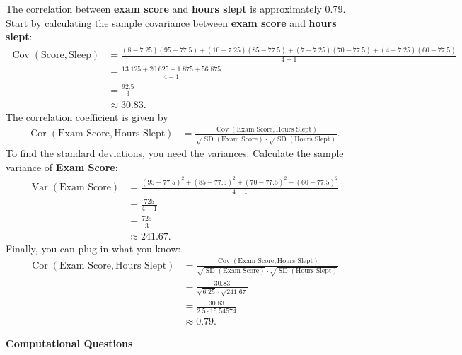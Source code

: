 \documentclass[11pt]{article}
\begin{document}
\begin{onehalfspacing}
\begin{enumerate}
\begin{enumerate}[label=(\alph*)]
\textcolor{PineGreen}{ The correlation between \textbf{exam score} and \textbf{hours slept} is approximately 0.79.
	Start by calculating the sample covariance between \textbf{exam score} and \textbf{hours slept}:
	\scriptsize
	\begin{align*}
	\mathop{\text{Cov}}(\text{Score}, \text{Sleep}) &= \frac{(8 - 7.25)(95 - 77.5) + (10 - 7.25)(85 - 77.5) + (7 - 7.25)(70 - 77.5) + (4 - 7.25)(60 - 77.5) }{4-1}
	\\ &= \frac{13.125 + 20.625 + 1.875 + 56.875}{4-1}
	\\ &= \frac{92.5}{3}
	\\ &\approx 30.83.
	\end{align*}	
	\normalsize	
	The correlation coefficient is given by
	\begin{align*}
	\mathop{\text{Cor}}(\text{Exam Score}, \text{Hours Slept}) &= \frac{\mathop{\text{Cov}}(\text{Exam Score}, \text{Hours Slept})}{\sqrt{\mathop{\text{SD}}(\text{Exam Score})} \cdot \sqrt{\mathop{\text{SD}}(\text{Hours Slept})}}.
	\end{align*}
	To find the standard deviations, you need the variances. 
	Calculate the sample variance of \textbf{Exam Score}:	
	\begin{align*}
	\mathop{\text{Var}}(\text{Exam Score}) &= \frac{(95 - 77.5)^2 + (85 - 77.5) ^2 + (70 - 77.5)^2 + (60 - 77.5)^2 }{4-1}
	\\ &= \frac{725}{4-1}
	\\ &= \frac{725}{3}
	\\ &\approx 241.67.
	\end{align*}	
	Finally, you can plug in what you know:	
	\begin{align*}
	\mathop{\text{Cor}}(\text{Exam Score}, \text{Hours Slept}) &= \frac{\mathop{\text{Cov}}(\text{Exam Score}, \text{Hours Slept})}{\sqrt{\mathop{\text{SD}}(\text{Exam Score})} \cdot \sqrt{\mathop{\text{SD}}(\text{Hours Slept})}}
	\\ &= \frac{30.83}{\sqrt{6.25} \cdot \sqrt{241.67}}
	\\ &= \frac{30.83}{2.5 \cdot 15.54574}
	\\ &\approx 0.79.
	\end{align*}	
	}
\end{enumerate}

\end{enumerate}

\newpage 

\begin{center}
\label{Computational}
\textbf{Computational Questions} \bigskip
\end{center}


\end{onehalfspacing}
\end{document}
